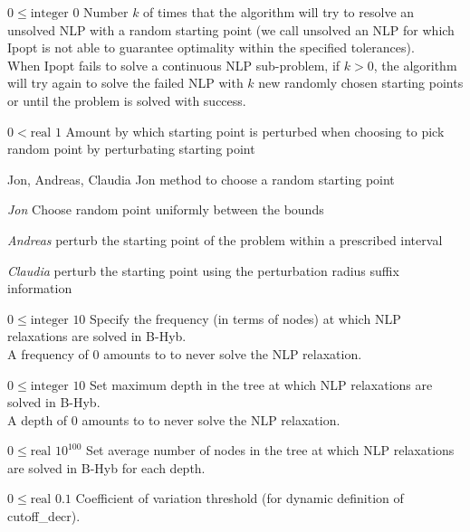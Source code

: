 %
{$0\leq\textrm{integer}$}%
{$0$}%
{Number $k$ of times that the algorithm will try to resolve an unsolved NLP with a random starting point (we call unsolved an NLP for which Ipopt is not able to guarantee optimality within the specified tolerances).\\
When Ipopt fails to solve a continuous NLP sub-problem, if $k > 0$, the algorithm will try again to solve the failed NLP with $k$ new randomly chosen starting points  or until the problem is solved with success.}%
{}

%
{$0<\textrm{real}$}%
{$1$}%
{Amount by which starting point is perturbed when choosing to pick random point by perturbating starting point}%
{}

%
{Jon, Andreas, Claudia}%
{Jon}%
{method to choose a random starting point}%
{\begin{list}{}{
\setlength{\parsep}{0em}
\setlength{\leftmargin}{3ex}
\setlength{\labelwidth}{1ex}
\setlength{\itemindent}{0ex}
\setlength{\topsep}{0pt}}
\item[\textit{Jon}] Choose random point uniformly between the bounds
\item[\textit{Andreas}] perturb the starting point of the problem within a prescribed interval
\item[\textit{Claudia}] perturb the starting point using the perturbation radius suffix information
\end{list}
}

%
{$0\leq\textrm{integer}$}%
{$10$}%
{Specify the frequency (in terms of nodes) at which NLP relaxations are solved in B-Hyb.\\
A frequency of 0 amounts to to never solve the NLP relaxation.}%
{}

%
{$0\leq\textrm{integer}$}%
{$10$}%
{Set maximum depth in the tree at which NLP relaxations are solved in B-Hyb.\\
A depth of 0 amounts to to never solve the NLP relaxation.}%
{}

%
{$0\leq\textrm{real}$}%
{$10^{ 100}$}%
{Set average number of nodes in the tree at which NLP relaxations are solved in B-Hyb for each depth.}%
{}

%
{$0\leq\textrm{real}$}%
{$0.1$}%
{Coefficient of variation threshold (for dynamic definition of cutoff\_decr).}%
{}

